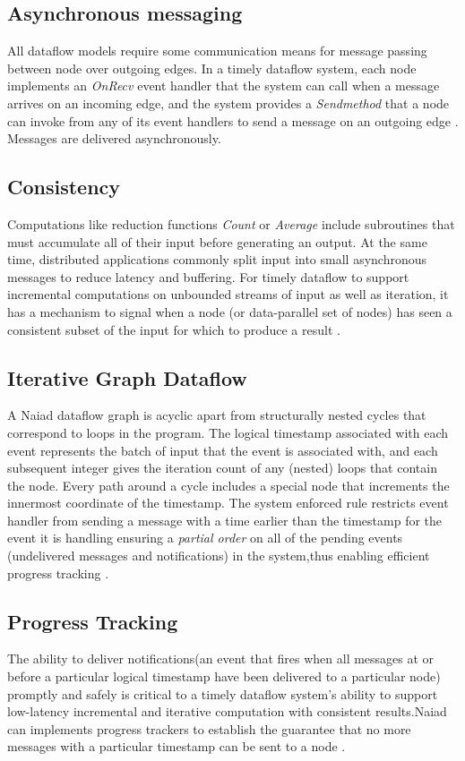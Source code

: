 \documentclass[9pt,twocolumn,twoside]{../../styles/osajnl}
\begin{document}
\subsection{Asynchronous messaging}
All dataflow models require some communication means for message
passing between node over outgoing edges. In a timely dataflow system,
each node implements an \textit{OnRecv} event handler that the system
can call when a message arrives on an incoming edge, and the system
provides a \textit{Sendmethod} that a node can invoke from any of its
event handlers to send a message on an outgoing edge
\cite{paper3-Naiad}. Messages are delivered asynchronously.

\subsection{Consistency}
Computations like reduction functions \textit{Count} or
\textit{Average} include subroutines that must accumulate all of their
input before generating an output. At the same time, distributed
applications commonly split input into small asynchronous messages to
reduce latency and buffering. For timely dataflow to support
incremental computations on unbounded streams of input as well as
iteration, it has a mechanism to signal when a node (or data-parallel
set of nodes) has seen a consistent subset of the input for which to
produce a result \cite{paper3-Naiad}.

\subsection{Iterative Graph Dataflow}
A Naiad dataflow graph is acyclic apart from structurally nested
cycles that correspond to loops in the program. The logical timestamp
associated with each event represents the batch of input that the
event is associated with, and each subsequent integer gives the
iteration count of any (nested) loops that contain the node. Every
path around a cycle includes a special node that increments the
innermost coordinate of the timestamp.  The system enforced rule
restricts event handler from sending a message with a time earlier
than the timestamp for the event it is handling ensuring a
\textit{partial order} on all of the pending events (undelivered
messages and notifications) in the system,thus enabling efficient
progress tracking \cite{paper1-Naiad}.


\subsection{Progress Tracking}
The ability to deliver notifications(an event that fires when all
messages at or before a particular logical timestamp have been
delivered to a particular node) promptly and safely is critical to a
timely dataflow system's ability to support low-latency incremental
and iterative computation with consistent results.Naiad can implements
progress trackers to establish the guarantee that no more messages
with a particular timestamp can be sent to a node \cite{paper1-Naiad}.
\end{document}
